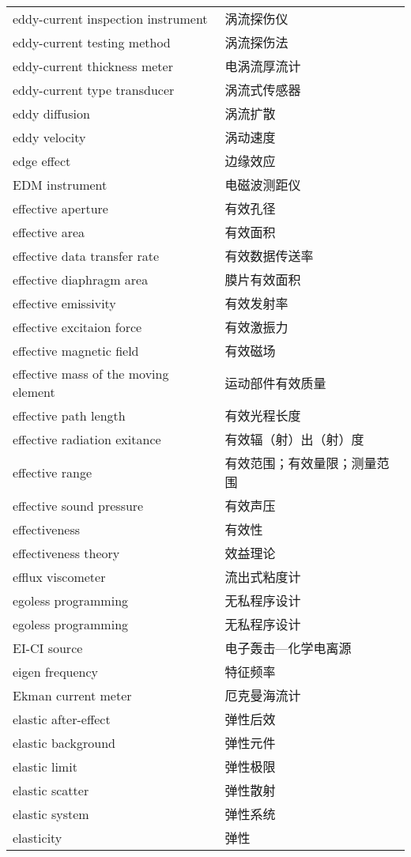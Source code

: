 \documentclass[
]{article}
\begin{document}
\begin{longtable}[]{@{}ll@{}}
eddy-current inspection instrument & 涡流探伤仪 \\
eddy-current testing method & 涡流探伤法 \\
eddy-current thickness meter & 电涡流厚流计 \\
eddy-current type transducer & 涡流式传感器 \\
eddy diffusion & 涡流扩散 \\
eddy velocity & 涡动速度 \\
edge effect & 边缘效应 \\
EDM instrument & 电磁波测距仪 \\
effective aperture & 有效孔径 \\
effective area & 有效面积 \\
effective data transfer rate & 有效数据传送率 \\
effective diaphragm area & 膜片有效面积 \\
effective emissivity & 有效发射率 \\
effective excitaion force & 有效激振力 \\
effective magnetic field & 有效磁场 \\
effective mass of the moving element & 运动部件有效质量 \\
effective path length & 有效光程长度 \\
effective radiation exitance & 有效辐（射）出（射）度 \\
effective range & 有效范围；有效量限；测量范围 \\
effective sound pressure & 有效声压 \\
effectiveness & 有效性 \\
effectiveness theory & 效益理论 \\
efflux viscometer & 流出式粘度计 \\
egoless programming & 无私程序设计 \\
egoless programming & 无私程序设计 \\
EI-CI source & 电子轰击---化学电离源 \\
eigen frequency & 特征频率 \\
Ekman current meter & 厄克曼海流计 \\
elastic after-effect & 弹性后效 \\
elastic background & 弹性元件 \\
elastic limit & 弹性极限 \\
elastic scatter & 弹性散射 \\
elastic system & 弹性系统 \\
elasticity & 弹性 \\

\end{longtable}
\end{document}
